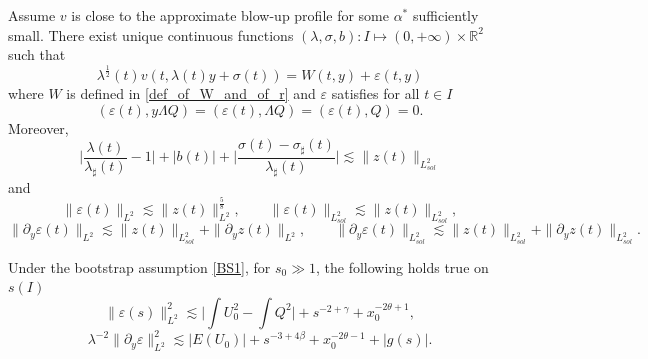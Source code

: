 \documentclass[10pt,a4paper]{amsart}
\newcommand{\RR}{\mathbb{R}}
\newcommand{\vare}{{\varepsilon}}
\begin{document}
\begin{lemma}\label{lemma_on_decomposition_around_Q}
    Assume $v$ is close to the approximate blow-up profile for some $\alpha^{*}$ sufficiently small. There exist unique continuous functions $(\lambda,\sigma,b):I\mapsto (0,+\infty) \times \RR^2$ such that
    \begin{equation}\label{decomposition_of_v_in_lemma}
        \lambda^{\frac{1}{2}}(t)v(t, \lambda(t)y+\sigma(t)) = W(t,y)+ \vare(t,y)
    \end{equation}
    where $W$ is defined in \eqref{def_of_W_and_of_r} and  $\vare$ satisfies for all $t\in I$
    \begin{equation}\label{orthogonal_conditions_in_lemma}
        (\vare(t),y\Lambda Q ) = (\vare(t),\Lambda Q) = (\vare(t), Q) = 0.
    \end{equation}
    Moreover,
    \begin{equation}
        \bigg\lvert \frac{\lambda(t)}{\lambda_{\sharp}(t)} - 1\bigg\rvert + |b(t)| + \bigg\lvert \frac{\sigma(t)-\sigma_{\sharp}(t)}{\lambda_{\sharp}(t)} \bigg\rvert \lesssim \|z(t)\|_{L^2_{sol}}
    \end{equation}
    and
    \begin{equation}\label{estimates_on_norms_of_vares_in_z_in_decomp}
        \|\vare(t)\|_{L^2} \lesssim \|z(t)\|^{\frac 58}_{L^2}, \qquad \|\vare(t)\|_{L^2_{sol}} \lesssim \|z(t)\|_{L^2_{sol}},
    \end{equation}
    \begin{equation}\label{estimates_on_norms_of_partial_vares_in_z_in_decomp}
        \|\partial_y \vare(t)\|_{L^2} \lesssim \|z(t)\|_{L^2_{sol}} + \|\partial_y z(t)\|_{L^2},  \qquad \|\partial_y \vare(t)\|_{L^2_{sol}} \lesssim \|z(t)\|_{L^2_{sol}}+\|\partial_y z(t)\|_{L^2_{sol}}.
    \end{equation}
\end{lemma}  

\begin{lemma}
    Under the bootstrap assumption \eqref{BS1}, for $s_0 \gg 1$, the following holds true on $s(I)$
    \begin{equation}\label{estimate_on_L2_norm_of_vare}
        \|\vare(s) \|^2_{L^2} \lesssim \Big\lvert\int U^2_0 - \int Q^2  \Big\rvert + s^{-2+\gamma}+ x^{-2\theta+1}_0,
    \end{equation}
    \begin{equation}\label{estimate_on_L2_norm_of_grad_vare}
        \lambda^{-2}\|\partial_y \vare\|^2_{L^2} \lesssim \lvert E(U_0)\rvert+s^{-3+4\beta}+x^{-2\theta-1}_0 + |g(s)|.
    \end{equation}
\end{lemma}
\end{document}
